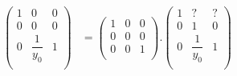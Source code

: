 \documentclass[10pt,a4paper]{article}
\begin{document}
\begin{equation*}
\begin{aligned}
    \begin{pmatrix}
    1 & 0 & 0  \\
    0 & 0 & 0 \\
    0 & \dfrac{1}{y_0} & 1  \\
  \end{pmatrix}  
 &= 
  \begin{pmatrix}
    1 & 0 & 0  \\
    0 & 0 & 0 \\
    0 & 0 & 1  \\
  \end{pmatrix}.
  \begin{pmatrix}
     1 & ? & ?  \\
    0 & 1 & 0 \\
    0 & \dfrac{1}{y_0} & 1  \\
  \end{pmatrix}
\end{aligned}
\end{equation*}
\end{document}
